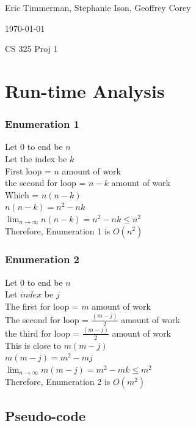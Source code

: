 \documentclass[letterpaper,10pt,titlepage]{article}
\def\name{Eric Timmerman, Stephanie Ison, Geoffrey Corey}
\begin{document}
\hfill \name

\hfill \today

\hfill CS 325 Proj 1

\section{Run-time Analysis}
\subsubsection{Enumeration 1}
Let $0$ to end be $n$\\
Let the index be $k$\\
First loop = $n$ amount of work\\
the second for loop = $n - k$ amount of work\\
Which = $n(n-k)$\\
$n(n-k) = n^{2}-nk$\\
$\lim_{n \rightarrow \infty} n(n-k) = n^{2}-nk \leq n^{2}$\\
Therefore, Enumeration 1 is $O(n^{2})$

\subsubsection{Enumeration 2}
Let $0$ to end be $n$\\
Let $index$ be $j$\\
The first for loop = $m$ amount of work\\
The second for loop = $\frac{(m-j)}{2}$ amount of work\\
the third for loop = $\frac{(m-j)}{2}$ amount of work\\
This is close to $m(m-j)$\\
$m(m-j) = m^{2}-mj$\\
$\lim_{n \rightarrow \infty} m(m-j) = m^{2}-mk \leq m^{2}$\\
Therefore, Enumeration 2 is $O(m^{2})$

\subsection{Pseudo-code}
\end{document}
